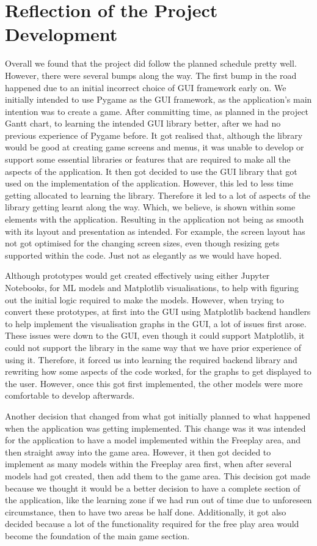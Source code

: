 	\section{Reflection of the Project Development}
		Overall we found that the project did follow the planned schedule pretty well. However, there were several bumps along the way. The first bump in the road happened due to an initial incorrect choice of GUI framework early on. We initially intended to use Pygame as the GUI framework, as the application's main intention was to create a game. After committing time, as planned in the project Gantt chart, to learning the intended GUI library better, after we had no previous experience of Pygame before. It got realised that, although the library would be good at creating game screens and menus, it was unable to develop or support some essential libraries or features that are required to make all the aspects of the application. It then got decided to use the GUI library that got used on the implementation of the application. However, this led to less time getting allocated to learning the library. Therefore it led to a lot of aspects of the library getting learnt along the way. Which, we believe, is shown within some elements with the application. Resulting in the application not being as smooth with its layout and presentation as intended. For example, the screen layout has not got optimised for the changing screen sizes, even though resizing gets supported within the code. Just not as elegantly as we would have hoped.

		Although prototypes would get created effectively using either Jupyter Notebooks, for ML models and Matplotlib visualisations, to help with figuring out the initial logic required to make the models. However, when trying to convert these prototypes, at first into the GUI using Matplotlib backend handlers to help implement the visualisation graphs in the GUI, a lot of issues first arose. These issues were down to the GUI, even though it could support Matplotlib, it could not support the library in the same way that we have prior experience of using it. Therefore, it forced us into learning the required backend library and rewriting how some aspects of the code worked, for the graphs to get displayed to the user. However, once this got first implemented, the other models were more comfortable to develop afterwards. 

		Another decision that changed from what got initially planned to what happened when the application was getting implemented. This change was it was intended for the application to have a model implemented within the Freeplay area, and then straight away into the game area. However, it then got decided to implement as many models within the Freeplay area first, when after several models had got created, then add them to the game area. This decision got made because we thought it would be a better decision to have a complete section of the application, like the learning zone if we had run out of time due to unforeseen circumstance, then to have two areas be half done. Additionally, it got also decided because a lot of the functionality required for the free play area would become the foundation of the main game section.

